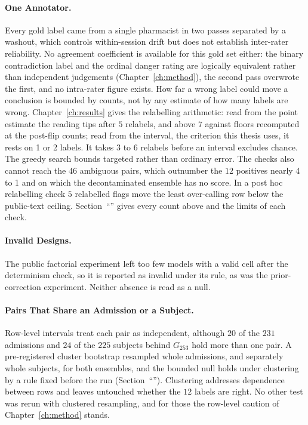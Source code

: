 \paragraph{One Annotator.} Every gold label came from a single pharmacist in two
passes separated by a washout, which controls within-session drift but does not
establish inter-rater reliability. No agreement coefficient is available for this
gold set either: the binary contradiction label and the ordinal danger rating are
logically equivalent rather than independent judgements
(Chapter~\ref{ch:method}), the second pass overwrote the first, and no
intra-rater figure exists. How far a wrong label could move a conclusion is
bounded by counts, not by any estimate of how many labels are wrong. Chapter~\ref{ch:results} gives the relabelling arithmetic: read from the point estimate the
reading tips after $5$ relabels, and above $7$ against floors recomputed at the post-flip
counts; read from the interval, the criterion this thesis uses, it rests on 1 or 2 labels.
It takes 3 to 6 relabels before an interval excludes chance. The greedy search bounds
targeted rather than ordinary error. The checks also cannot reach the $46$ ambiguous
pairs, which outnumber the $12$ positives nearly 4 to 1 and on which the
decontaminated ensemble has no score. In a post hoc relabelling check $5$
relabelled flags move the least over-calling row below the public-text ceiling.
Section~``'' gives every count above and the limits of each
check.

\paragraph{Invalid Designs.} The public factorial experiment left too few
models with a valid cell after the determinism check, so it is reported as invalid under its rule, as was the prior-correction experiment. Neither
absence is read as a null.

\paragraph{Pairs That Share an Admission or a Subject.} Row-level intervals treat
each pair as independent, although $20$ of the $231$ admissions and $24$ of the
$225$ subjects behind $G_{253}$ hold more than one pair. A pre-registered cluster bootstrap resampled whole admissions, and separately whole
subjects, for both ensembles, and the bounded null holds under clustering by a rule fixed
before the run (Section~``''). Clustering addresses
dependence between rows and leaves untouched whether the $12$ labels are right.
No other test was rerun with clustered resampling, and for those the row-level
caution of Chapter~\ref{ch:method} stands.

